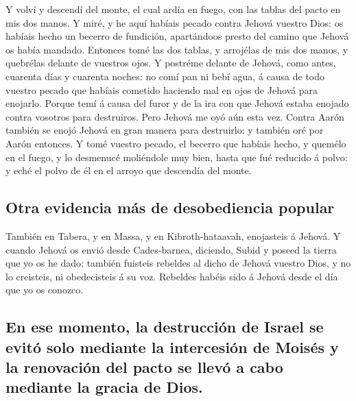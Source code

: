  Y volví y descendí del monte, el cual ardía en fuego, con
las tablas del pacto en mis dos manos.  Y miré, y he aquí
habíais pecado contra Jehová vuestro Dios: os habíais hecho un becerro
de fundición, apartándoos presto del camino que Jehová os había mandado.
 Entonces tomé las dos tablas, y arrojélas de mis dos
manos, y quebrélas delante de vuestros ojos.  Y postréme
delante de Jehová, como antes, cuarenta días y cuarenta noches: no comí
pan ni bebí agua, á causa de todo vuestro pecado que habíais cometido
haciendo mal en ojos de Jehová para enojarlo.  Porque temí
á causa del furor y de la ira con que Jehová estaba enojado contra
vosotros para destruiros. Pero Jehová me oyó aún esta vez. 
Contra Aarón también se enojó Jehová en gran manera para destruirlo: y
también oré por Aarón entonces.  Y tomé vuestro pecado, el
becerro que habíais hecho, y quemélo en el fuego, y lo desmenucé
moliéndole muy bien, hasta que fué reducido á polvo: y eché el polvo de
él en el arroyo que descendía del monte.

\hypertarget{otra-evidencia-muxe1s-de-desobediencia-popular}{%
\subsection{Otra evidencia más de desobediencia
popular}\label{otra-evidencia-muxe1s-de-desobediencia-popular}}

 También en Tabera, y en Massa, y en Kibroth-hataavah,
enojasteis á Jehová.  Y cuando Jehová os envió desde
Cades-barnea, diciendo, Subid y poseed la tierra que yo os he dado;
también fuisteis rebeldes al dicho de Jehová vuestro Dios, y no lo
creisteis, ni obedecisteis á su voz.  Rebeldes habéis sido
á Jehová desde el día que yo os conozco.

\hypertarget{en-ese-momento-la-destrucciuxf3n-de-israel-se-evituxf3-solo-mediante-la-intercesiuxf3n-de-moisuxe9s-y-la-renovaciuxf3n-del-pacto-se-llevuxf3-a-cabo-mediante-la-gracia-de-dios.}{%
\subsection{En ese momento, la destrucción de Israel se evitó solo
mediante la intercesión de Moisés y la renovación del pacto se llevó a
cabo mediante la gracia de
Dios.}\label{en-ese-momento-la-destrucciuxf3n-de-israel-se-evituxf3-solo-mediante-la-intercesiuxf3n-de-moisuxe9s-y-la-renovaciuxf3n-del-pacto-se-llevuxf3-a-cabo-mediante-la-gracia-de-dios.}}

